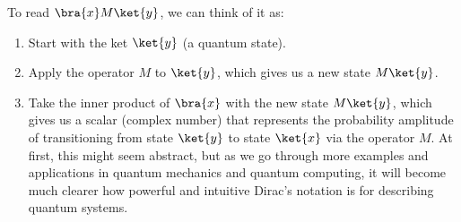 \highspace
To read $\bra{x} M \ket{y}$, we can think of it as:
\begin{enumerate}
    \item Start with the ket $\ket{y}$ (a quantum state).
    \item Apply the operator $M$ to $\ket{y}$, which gives us a new state $M \ket{y}$.
    \item Take the inner product of $\bra{x}$ with the new state $M \ket{y}$, which gives us a scalar (complex number) that represents the probability amplitude of transitioning from state $\ket{y}$ to state $\ket{x}$ via the operator $M$. At first, this might seem abstract, but as we go through more examples and applications in quantum mechanics and quantum computing, it will become much clearer how powerful and intuitive Dirac's notation is for describing quantum systems.
\end{enumerate}